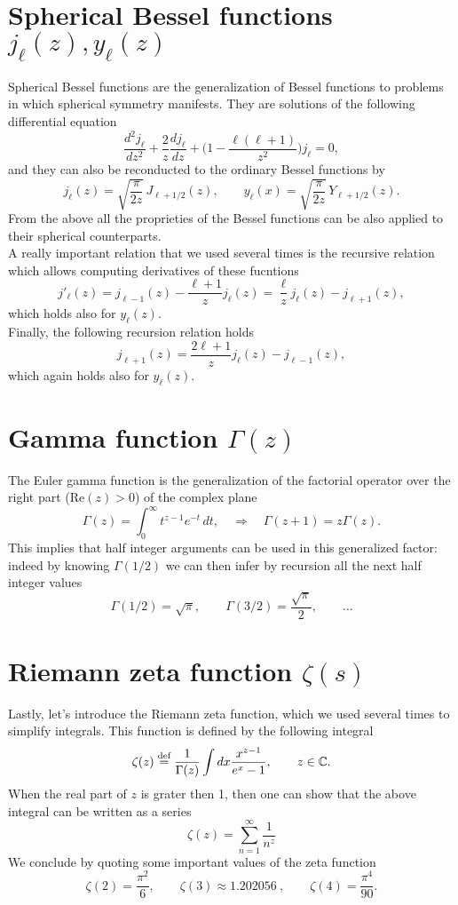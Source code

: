 \section{Spherical Bessel functions \(j_\ell(z), y_\ell(z)\)}
\label{app:sph_bessel}
Spherical Bessel functions are the generalization of Bessel functions to problems in which spherical symmetry manifests. They are solutions of the following differential equation
$$\frac{d^2j_\ell}{dz^2}+\frac{2}{z}\frac{dj_\ell}{dz}+\bigg(1-\frac{\ell(\ell+1)}{z^2}\bigg)j_\ell=0,$$
and they can also be reconducted to the ordinary Bessel functions by
\[
j_\ell(z)=\sqrt{\frac{\pi}{2z}}\,J_{\ell+1/2}(z),\qquad
y_\ell(x)=\sqrt{\frac{\pi}{2z}}\,Y_{\ell+1/2}(z).
\]
From the above all the proprieties of the Bessel functions can be also applied to their spherical counterparts.\\
A really important relation that we used several times is the recursive relation which allows computing derivatives of these fucntions
$$j'_\ell(z)=j_{\ell-1}(z)-\frac{\ell+1}{z}j_\ell(z)=\frac\ell zj_\ell(z)-j_{\ell+1}(z),$$
which holds also for $y_\ell(z).$\\Finally, the following recursion relation holds
$$j_{\ell+1}(z)=\frac{2\ell+1}{z}j_\ell(z)-j_{\ell-1}(z),$$
which again holds also for $y_\ell(z)$.
 
\section{Gamma function \(\Gamma(z)\)}
\label{app:gamma}
The Euler gamma function is the generalization of the factorial operator over the right part ($\text{Re}(z)>0$) of the complex plane
\[
\Gamma(z)=\int_0^\infty t^{z-1}e^{-t}\,dt,\quad\Rightarrow\quad \Gamma(z+1)=z\Gamma(z).
\]
This implies that half integer arguments can be used in this generalized factor: indeed by knowing $\Gamma(1/2)$ we can then infer by recursion all the next half integer values 
\[
\Gamma\!\left(1/2\right)=\sqrt{\pi},\qquad
\Gamma\!\left(3/2\right)=\frac{\sqrt{\pi}}{2},\qquad\dots
\]

\section{Riemann zeta function \(\zeta(s)\)}
\label{app:zeta}
Lastly, let's introduce the Riemann zeta function, which we used several times to simplify integrals.
This function is defined by the following integral  
\[
\zeta(z)\stackrel{\text{def}}{=}\frac{1}{\Gamma(z)}\int dx\frac{x^{z-1}}{e^x-1},\qquad z\in \mathbb C.
\]
When the real part of $z$ is grater then 1, then one can show that the above integral can be written as a series
$$\zeta(z)=\sum_{n=1}^{\infty}\frac{1}{n^z}$$
We conclude by quoting some important values of the zeta function 
\[
\zeta(2)=\frac{\pi^2}{6},\qquad
\zeta(3)\approx 1.202056\ ,\qquad
\zeta(4)=\frac{\pi^4}{90}.
\]



